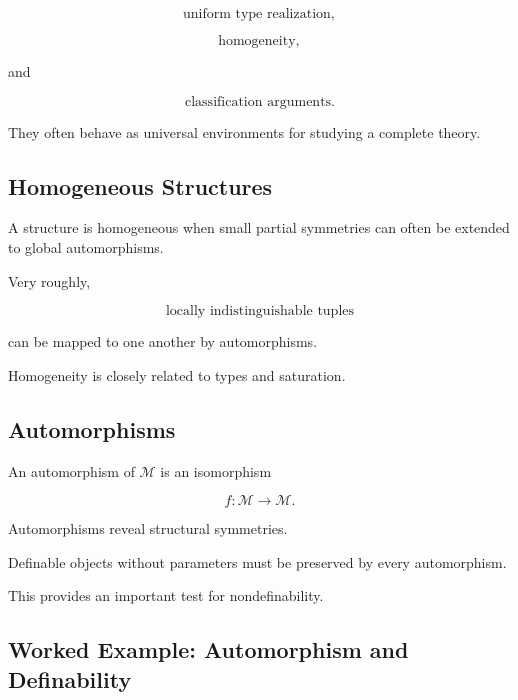 \[
\boxed{
\text{uniform type realization},
}
\]

\[
\boxed{
\text{homogeneity},
}
\]

and

\[
\boxed{
\text{classification arguments}.
}
\]

They often behave as universal environments for studying a complete
theory.

\subsection{Homogeneous Structures}
\label{subsec:homogeneous-structures}

A structure is homogeneous when small partial symmetries can often be
extended to global automorphisms.

Very roughly,

\[
\boxed{
\text{locally indistinguishable tuples}
}
\]

can be mapped to one another by automorphisms.

Homogeneity is closely related to types and saturation.

\subsection{Automorphisms}
\label{subsec:model-theoretic-automorphisms}

An automorphism of \(\mathcal{M}\) is an isomorphism

\[
\boxed{
f:\mathcal{M}\to\mathcal{M}.
}
\]

Automorphisms reveal structural symmetries.

Definable objects without parameters must be preserved by every
automorphism.

This provides an important test for nondefinability.

\subsection{Worked Example: Automorphism and Definability}
\label{subsec:worked-automorphism-definability}

